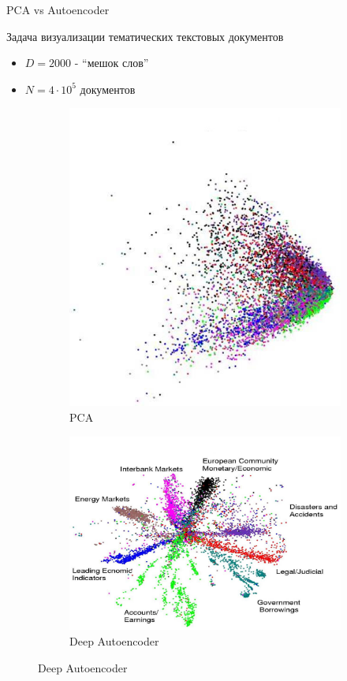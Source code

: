 \documentclass[10pt]{beamer}
\begin{document}
\begin{frame}{PCA vs Autoencoder}
\begin{block}{Задача визуализации тематических текстовых документов}
\begin{itemize}
\item $D=2000$ - ``мешок слов''
\item $N=4 \cdot 10^5$ документов
\end{itemize}
\end{block}
\begin{figure}
    \centering
    \begin{subfigure}[b]{0.45\textwidth}
        \includegraphics[width=\textwidth]{images/hpca.jpg}
        \caption{PCA}
    \end{subfigure}
    \begin{subfigure}[b]{0.45\textwidth}
        \includegraphics[width=\textwidth]{images/hauto.jpg}
        \caption{Deep Autoencoder}
    \end{subfigure}
\end{figure}
\end{frame}
\end{document}
